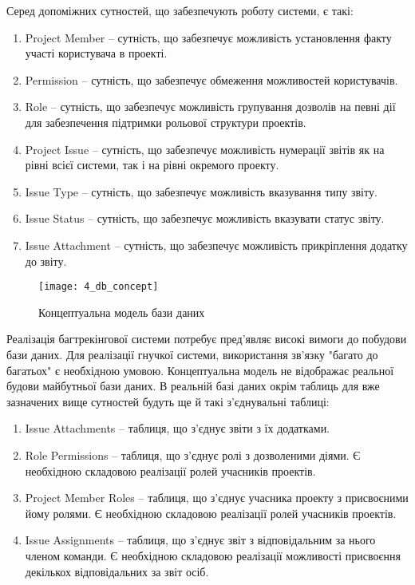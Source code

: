 \documentclass[../main.tex]{subfiles}
\begin{document}
Серед допоміжних сутностей, що забезпечують роботу системи, є такі:
\begin{enumerate}
	\item Project Member -- сутність, що забезпечує можливість установлення факту участі користувача в проекті.
	\item Permission -- сутність, що забезпечує обмеження можливостей користувачів.
	\item Role -- сутність, що забезпечує можливість групування дозволів на певні дії для забезпечення підтримки рольової структури проектів.
	\item Project Issue -- сутність, що забезпечує можливість нумерації звітів як на рівні всієї системи, так і на рівні окремого проекту.
	\item Issue Type -- сутність, що забезпечує можливість вказування типу звіту.
	\item Issue Status -- сутність, що забезпечує можливість вказувати статус звіту.
	\item Issue Attachment -- сутність, що забезпечує можливість прикріплення додатку до звіту.
\end{enumerate}

\begin{figure}[H]
	\centering
	\texttt{[image: 4\_db\_concept]}
	\caption{Концептуальна модель бази даних}
\end{figure}

Реалізація багтрекінгової системи потребує пред'являє високі вимоги до побудови бази даних. Для реалізації гнучкої системи, використання зв'язку "багато до багатьох" є необхідною умовою. Концептуальна модель не відображає реальної будови майбутньої бази даних. В реальній базі даних окрім таблиць для вже зазначених вище сутностей будуть ще й такі з'єднувальні таблиці:

\begin{enumerate}
	\item Issue Attachments -- таблиця, що з'єднує звіти з їх додатками.
	\item Role Permissions -- таблиця, що з'єднує ролі з дозволеними діями. Є необхідною складовою реалізації ролей учасників проектів.
	\item Project Member Roles -- таблиця, що з'єднує учасника проекту з присвоєними йому ролями. Є необхідною складовою реалізації ролей учасників проектів.
	\item Issue Assignments -- таблиця, що з'єднує звіт з відповідальним за нього членом команди. Є необхідною складовою реалізації можливості присвоєння декількох відповідальних за звіт осіб.
\end{enumerate}
\end{document}
